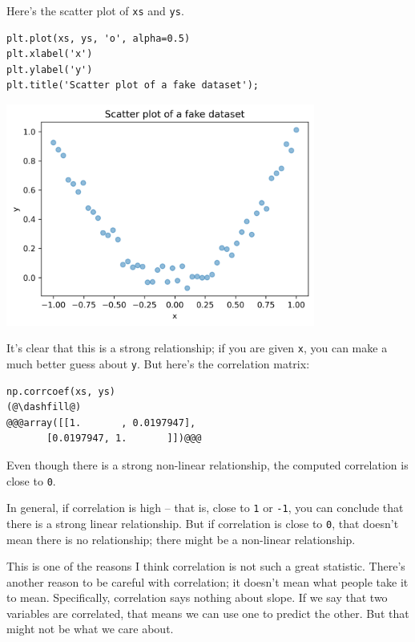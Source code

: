 Here's the scatter plot of \passthrough{\lstinline!xs!} and
\passthrough{\lstinline!ys!}.

\begin{lstlisting}[]
plt.plot(xs, ys, 'o', alpha=0.5)
plt.xlabel('x')
plt.ylabel('y')
plt.title('Scatter plot of a fake dataset');
\end{lstlisting}

\begin{center}
\includegraphics[width=4in]{09_relationships_files/09_relationships_62_0.png}
\end{center}

It's clear that this is a strong relationship; if you are given
\passthrough{\lstinline!x!}, you can make a much better guess about
\passthrough{\lstinline!y!}. But here's the correlation matrix:

\begin{lstlisting}[]
np.corrcoef(xs, ys)
(@\dashfill@)
@@@array([[1.       , 0.0197947],
       [0.0197947, 1.       ]])@@@
\end{lstlisting}

Even though there is a strong non-linear relationship, the computed
correlation is close to \passthrough{\lstinline!0!}.

In general, if correlation is high -- that is, close to
\passthrough{\lstinline!1!} or \passthrough{\lstinline!-1!}, you can
conclude that there is a strong linear relationship. But if correlation
is close to \passthrough{\lstinline!0!}, that doesn't mean there is no
relationship; there might be a non-linear relationship.

This is one of the reasons I think correlation is not such a great
statistic. There's another reason to be careful with correlation; it
doesn't mean what people take it to mean. Specifically, correlation says
nothing about slope. If we say that two variables are correlated, that
means we can use one to predict the other. But that might not be what we
care about.


